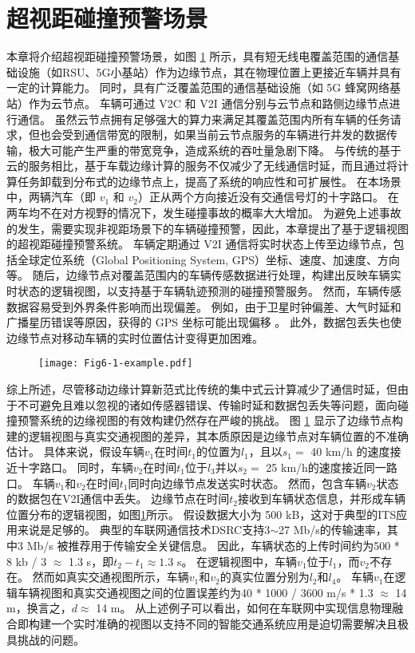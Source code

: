 \section{超视距碰撞预警场景}\label{section 5-2}

本章将介绍超视距碰撞预警场景，如图 \ref{fig 5-1} 所示，具有短无线电覆盖范围的通信基础设施（如RSU、5G小基站）作为边缘节点，其在物理位置上更接近车辆并具有一定的计算能力。
同时，具有广泛覆盖范围的通信基础设施（如 5G 蜂窝网络基站）作为云节点。
车辆可通过 V2C 和 V2I 通信分别与云节点和路侧边缘节点进行通信。
虽然云节点拥有足够强大的算力来满足其覆盖范围内所有车辆的任务请求，但也会受到通信带宽的限制，如果当前云节点服务的车辆进行并发的数据传输，极大可能产生严重的带宽竞争，造成系统的吞吐量急剧下降。
与传统的基于云的服务相比，基于车载边缘计算的服务不仅减少了无线通信时延，而且通过将计算任务卸载到分布式的边缘节点上，提高了系统的响应性和可扩展性。
在本场景中，两辆汽车（即 $v_1$ 和 $v_2$）正从两个方向接近没有交通信号灯的十字路口。
在两车均不在对方视野的情况下，发生碰撞事故的概率大大增加。
为避免上述事故的发生，需要实现非视距场景下的车辆碰撞预警，因此，本章提出了基于逻辑视图的超视距碰撞预警系统。
车辆定期通过 V2I 通信将实时状态上传至边缘节点，包括全球定位系统（Global Positioning System, GPS）坐标、速度、加速度、方向等。
随后，边缘节点对覆盖范围内的车辆传感数据进行处理，构建出反映车辆实时状态的逻辑视图，以支持基于车辆轨迹预测的碰撞预警服务。
然而，车辆传感数据容易受到外界条件影响而出现偏差。
例如，由于卫星时钟偏差、大气时延和广播星历错误等原因，获得的 GPS 坐标可能出现偏移 \cite{liu2013improving}。
此外，数据包丢失也使边缘节点对移动车辆的实时位置估计变得更加困难。

\begin{figure}[h]
	\centering
	\texttt{[image: Fig6-1-example.pdf]}
	\label{fig 5-1}
\end{figure}

综上所述，尽管移动边缘计算新范式比传统的集中式云计算减少了通信时延，但由于不可避免且难以忽视的诸如传感器错误、传输时延和数据包丢失等问题，面向碰撞预警系统的边缘视图的有效构建仍然存在严峻的挑战。
图 \ref{fig 5-1} 显示了边缘节点构建的逻辑视图与真实交通视图的差异，其本质原因是边缘节点对车辆位置的不准确估计。
具体来说，假设车辆$v_1$在时间$t_1$的位置为$l_1$，且以$s_1 =$ 40 km/h 的速度接近十字路口。
同时，车辆$v_2$在时间$t_1$位于$l_3$并以$s_2=$ 25 km/h的速度接近同一路口。
车辆$v_1$和$v_2$在时间$t_1$同时向边缘节点发送实时状态。
然而，包含车辆$v_2$状态的数据包在V2I通信中丢失。
边缘节点在时间$t_2$接收到车辆状态信息，并形成车辆位置分布的逻辑视图，如图\ref{fig 5-1}所示。
假设数据大小为 500 kB，这对于典型的ITS应用来说是足够的\cite{liu2013improving}。
典型的车联网通信技术DSRC支持3$\sim$27 Mb/s的传输速率，其中3 Mb/s 被推荐用于传输安全关键信息\cite{kenney2011dedicated}。
因此，车辆状态的上传时间约为500 * 8 kb / 3 $\approx$ 1.3 s，即${t_2} - {t_1} \approx 1.3$ s。
在逻辑视图中，车辆$v_1$位于$l_1$，而$v_2$不存在。
然而如真实交通视图所示，车辆$v_1$和$v_2$的真实位置分别为$l_2$和$l_4$。
车辆$v_1$在逻辑车辆视图和真实交通视图之间的位置误差约为40 * 1000 / 3600 m/s * 1.3 $\approx$ 14 m，换言之，$d \approx$ 14 m。
从上述例子可以看出，如何在车联网中实现信息物理融合即构建一个实时准确的视图以支持不同的智能交通系统应用是迫切需要解决且极具挑战的问题。

